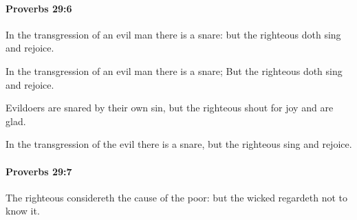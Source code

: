 		\paragraph{Proverbs 29:6} %
			\label{PROVERBS-29-6}

			In the transgression of an evil man there is a snare: but the righteous doth sing and rejoice.

			\begin{versebox}
					\item[BHS] 
					\item[ASV] In the transgression of an evil man there is a snare; But the righteous doth sing and rejoice.
					\item[NIV] Evildoers are snared by their own sin, but the righteous shout for joy and are glad.
					\item[NRSV] In the transgression of the evil there is a snare, but the righteous sing and rejoice.
			\end{versebox}

		\paragraph{Proverbs 29:7} %
			\label{PROVERBS-29-7}

			The righteous considereth the cause of the poor: but the wicked regardeth not to know it.

